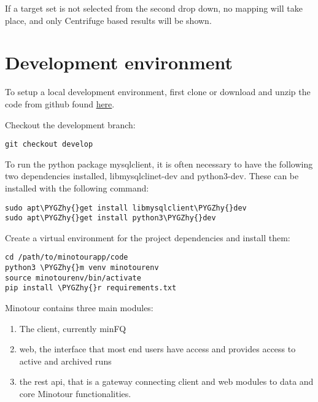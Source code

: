 \documentclass[letterpaper,10pt,english]{sphinxmanual}
\def\PYGZhy{\char`\-}
\begin{document}
If a target set is not selected from the second drop down, no mapping will take place, and only Centrifuge based results will be shown.


\chapter{Development environment}
\label{development::doc}\label{development:development-environment}
To setup a local development environment, first clone or download and unzip the code from github found \href{https://github.com/LooseLab/minotourapp.git}{here}.

Checkout the development branch:

\begin{Verbatim}[commandchars=\\\{\}]
git checkout develop
\end{Verbatim}

To run the python package mysqlclient, it is often necessary to have the following two dependencies installed, libmysqlclinet-dev and python3-dev. These can be installed with the following command:

\begin{Verbatim}[commandchars=\\\{\}]
sudo apt\PYGZhy{}get install libmysqlclient\PYGZhy{}dev
sudo apt\PYGZhy{}get install python3\PYGZhy{}dev
\end{Verbatim}

Create a virtual environment for the project dependencies and install them:

\begin{Verbatim}[commandchars=\\\{\}]
cd /path/to/minotourapp/code
python3 \PYGZhy{}m venv minotourenv
source minotourenv/bin/activate
pip install \PYGZhy{}r requirements.txt
\end{Verbatim}

Minotour contains three main modules:
\begin{enumerate}
\item {} 
The client, currently minFQ

\item {} 
web, the interface that most end users have access and provides access to active and archived runs

\item {} 
the rest api, that is a gateway connecting client and web modules to data and core Minotour functionalities.

\end{enumerate}
\end{document}
